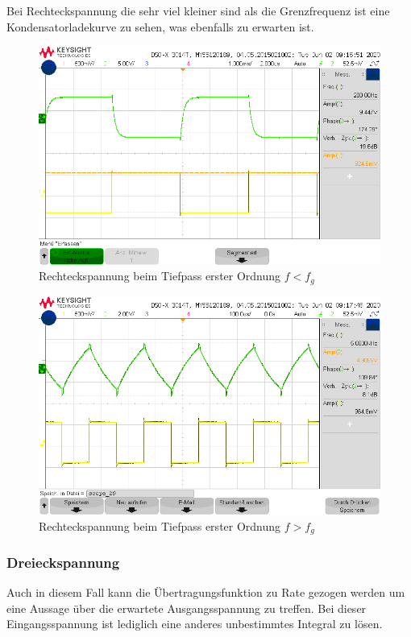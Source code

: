 Bei Rechteckspannung die sehr viel kleiner sind als die Grenzfrequenz ist eine Kondensatorladekurve zu sehen, was ebenfalls zu erwarten ist. 

\begin{figure}[H]
    \centering
    \includegraphics[width=\textwidth]{Lab_2/Messungen/TP_first_order/scope_26.png}
    \caption{Rechteckspannung beim Tiefpass erster Ordnung $f < f_g$}
    \label{fig:Rechteck_Tiefpass_erster_Ordnung_small_f}
\end{figure}
\begin{figure}[H]
    \centering
    \includegraphics[width=\textwidth]{Lab_2/Messungen/TP_first_order/scope_29.png}
    \caption{Rechteckspannung beim Tiefpass erster Ordnung $f > f_g$}
    \label{fig:Rechteck_Tiefpass_erster_Ordnung_big_f}
\end{figure}

\subsubsection{Dreieckspannung}
Auch in diesem Fall kann die Übertragungsfunktion zu Rate gezogen werden um eine Aussage über die erwartete Ausgangsspannung zu treffen. Bei dieser Eingangsspannung ist lediglich eine anderes unbestimmtes Integral zu lösen.

